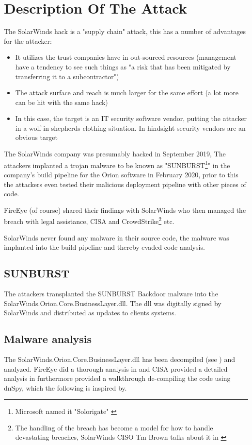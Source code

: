 \documentclass[
	letterpaper, %
	10pt, %
	unnumberedsections, %
	twoside, %
]{LTJournalArticle}
\begin{document}
\section{Description Of The Attack} 
The SolarWinds hack is a "supply chain" attack, this has a number of advantages for the attacker:

\begin{itemize}
	\item It utilizes the trust companies have in out-sourced resources (management have a tendency to see such things as "a risk that has been mitigated by transferring it to a subcontractor") 
	\item The attack surface and reach is much larger for the same effort (a lot more can be hit with the same hack)
	\item In this case, the target is an IT security software vendor, putting the attacker in a wolf in shepherds clothing situation. In hindsight security vendors are an obvious target
\end{itemize} 

The SolarWinds company was presumably hacked in September 2019\cite{TechTargetSolarwinds}, The attackers implanted a trojan malware to be known as "SUNBURST\footnote{Microsoft named it "Solorigate" \cite{MicrosoftSolarwinds}}" in the company's build pipeline for the Orion software in February 2020, prior to this the attackers even tested their malicious deployment pipeline with other pieces of code\cite{orangematterSunburst}. 
\par
FireEye (of course) shared their findings with SolarWinds who then managed the breach with legal assistance, CISA and CrowdStrike\footnote{The handling of the breach has become a model for how to handle devastating breaches, SolarWinds CISO Tm Brown talks about it in \cite{CISA_sunburst}} etc.   

SolarWinds never found any malware in their source code, the malware was implanted into the build pipeline and thereby evaded code analysis. 

\subsection{SUNBURST}
The attackers transplanted the SUNBURST Backdoor malware into the SolarWinds.Orion.Core.BusinessLayer.dll\cite{Mandiant}. The dll was digitally signed by SolarWinds and distributed as updates to clients systems.

\subsection{Malware analysis}     
The SolarWinds.Orion.Core.BusinessLayer.dll has been decompiled (see \cite{SolarWindsOrionCoreBusinessLayerdll}) and analyzed. FireEye did a thorough analysis in\cite{Mandiant} and CISA provided a detailed analysis in \cite{CISA_sunburst} furthermore \cite{cybercdh} provided a walkthrough de-compiling the code using dnSpy, which the following is inspired by.
\end{document}
